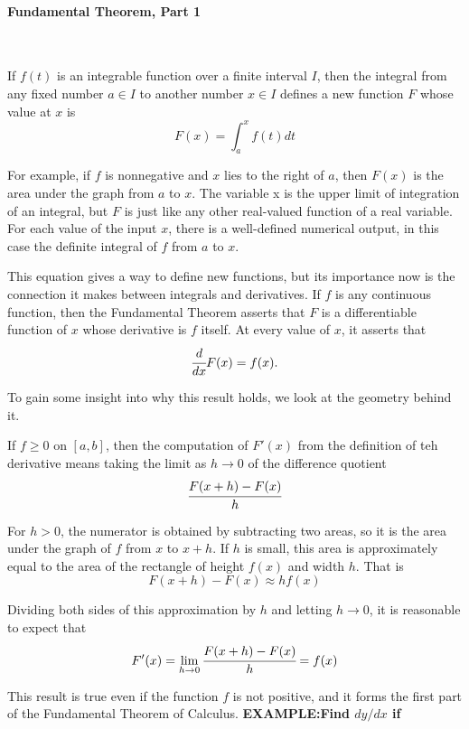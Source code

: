 \documentclass{article}
\begin{document}
            \paragraph{Fundamental Theorem, Part 1}
            \text{}\\
            \par If $f(t)$ is an integrable function over a finite interval $I$, then the integral from any fixed number $a\in I$ to another number $x\in I$ defines a new function $F$ whose value at $x$ is
            \[F(x)=\int_a^xf(t)dt\]
            \par For example, if $f$ is nonnegative and $x$ lies to the right of $a$, then $F(x)$ is the area under the graph from $a$ to $x$. The variable x is the upper limit of integration of an integral, but $F$ is just like any other real-valued function of a real variable. For each value of the input $x$, there is a well-defined numerical output, in this case the definite integral of $f$ from $a$ to $x$.
            \par This equation gives a way to define new functions, but its importance now is the connection it makes between integrals and derivatives. If $f$ is any continuous function, then the Fundamental Theorem asserts that $F$ is a differentiable function of $x$ whose derivative is $f$ itself. At every value of $x$, it asserts that
            \[\cfrac{d}{dx}F(x)=f(x).\]
            \par To gain some insight into why this result holds, we look at the geometry behind it.
            \par If $f\ge 0$ on $[a,b]$, then the computation of $F'(x)$ from the definition of teh derivative means taking the limit as $h\to 0$ of the difference quotient
            \[\cfrac{F(x+h)-F(x)}{h}\]
            \par For $h>0$, the numerator is obtained by subtracting two areas, so it is the area under the graph of $f$ from $x$ to $x+h$. If $h$ is small, this area is approximately equal to the area of the rectangle of height $f(x)$ and width $h$. That is
            \[F(x+h)-F(x)\approx hf(x)\]
            \par Dividing both sides of this approximation by $h$ and letting $h\to 0$, it is reasonable to expect that
            \[F'(x)=\lim\limits_{h\to 0}\cfrac{F(x+h)-F(x)}{h}=f(x)\]
            \par This result is true even if the function $f$ is not positive, and it forms the first part of the Fundamental Theorem of Calculus.
            \textbf{EXAMPLE:Find $dy/dx$ if}\\
\end{document}
